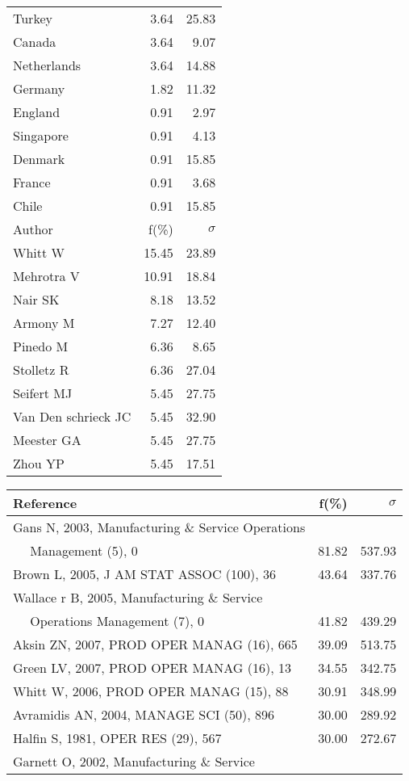 \documentclass[a4paper,11pt]{report}
\begin{document}
\begin{landscape}
\begin{table}[!ht]
{\begin{tabular}{|l r r|}
Turkey & 3.64 & 25.83\\
Canada & 3.64 & 9.07\\
Netherlands & 3.64 & 14.88\\
Germany & 1.82 & 11.32\\
England & 0.91 & 2.97\\
Singapore & 0.91 & 4.13\\
Denmark & 0.91 & 15.85\\
France & 0.91 & 3.68\\
Chile & 0.91 & 15.85\\
\hline
\hline
Author & f(\%) & $\sigma$\\
\hline
Whitt W & 15.45 & 23.89\\
Mehrotra V & 10.91 & 18.84\\
Nair SK & 8.18 & 13.52\\
Armony M & 7.27 & 12.40\\
Pinedo M & 6.36 & 8.65\\
Stolletz R & 6.36 & 27.04\\
Seifert MJ & 5.45 & 27.75\\
Van Den schrieck JC & 5.45 & 32.90\\
Meester GA & 5.45 & 27.75\\
Zhou YP & 5.45 & 17.51\\
\hline
\end{tabular}
}
{\scriptsize\begin{tabular}{|l r r|}
\hline
Reference & f(\%) & $\sigma$\\
\hline
Gans N, 2003, Manufacturing \& Service Operations &  & \\
$\quad$ Management (5), 0 & 81.82 & 537.93\\
Brown L, 2005, J AM STAT ASSOC (100), 36 & 43.64 & 337.76\\
Wallace r B, 2005, Manufacturing \& Service &  & \\
$\quad$ Operations Management (7), 0 & 41.82 & 439.29\\
Aksin ZN, 2007, PROD OPER MANAG (16), 665 & 39.09 & 513.75\\
Green LV, 2007, PROD OPER MANAG (16), 13 & 34.55 & 342.75\\
Whitt W, 2006, PROD OPER MANAG (15), 88 & 30.91 & 348.99\\
Avramidis AN, 2004, MANAGE SCI (50), 896 & 30.00 & 289.92\\
Halfin S, 1981, OPER RES (29), 567 & 30.00 & 272.67\\
Garnett O, 2002, Manufacturing \& Service &  & \\

\end{tabular}}
\end{table}
\end{landscape}
\end{document}
